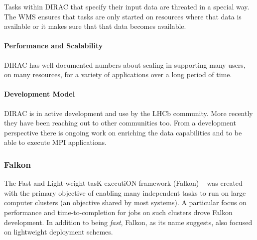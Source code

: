 \documentclass{sig-alternate}
\begin{document}
Tasks within DIRAC that specify their input data are threated in a special way.
The WMS ensures that tasks are only started on resources where that data is
available or it makes sure that that data becomes available.

\paragraph{Performance and Scalability}

DIRAC has well documented numbers about scaling in supporting many users, on
many resources, for a variety of applications over a long period of time.

\paragraph{Development Model}

DIRAC is in active development and use by the LHCb community\cite{}.
More recently they have been reaching out to other communities too\cite{}.
From a development perspective there is ongoing work on enriching the data
capabilities\cite{} and to be able to execute MPI applications\cite{}.

%
%
\subsubsection{Falkon}
\label{sec:falkon}


The Fast and Light-weight tasK executiON framework (Falkon) ~\cite{1362680} was
created with the primary objective of enabling many independent tasks to run on
large computer clusters (an objective shared by most \pilotjob systems).
A particular focus on performance and time-to-completion for jobs on such
clusters drove Falkon development.
In addition to being \textit{fast}, Falkon, as its name suggests, also focused
on lightweight deployment schemes.
\end{document}
